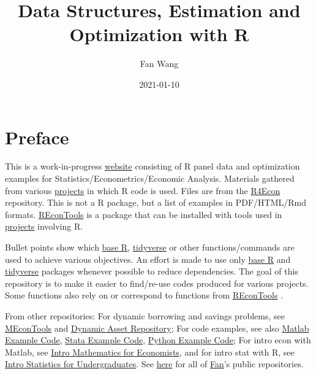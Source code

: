 \documentclass[
]{book}
\title{Data Structures, Estimation and Optimization with R}
\author{Fan Wang}
\date{2021-01-10}
\begin{document}
\maketitle

{
\hypersetup{linkcolor=}
\setcounter{tocdepth}{1}
\tableofcontents
}
\hypertarget{preface}{%
\chapter*{Preface}\label{preface}}

This is a work-in-progress \href{https://fanwangecon.github.io/R4Econ/}{website} consisting of R panel data and optimization examples for Statistics/Econometrics/Economic Analysis. Materials gathered from various \href{https://fanwangecon.github.io/research}{projects} in which R code is used. Files are from the \href{https://github.com/FanWangEcon/R4Econ}{R4Econ} repository. This is not a R package, but a list of examples in PDF/HTML/Rmd formats. \href{https://fanwangecon.github.io/REconTools/}{REconTools} is a package that can be installed with tools used in \href{https://fanwangecon.github.io/research}{projects} involving R.

Bullet points show which \href{https://www.rdocumentation.org/packages/base/versions/3.5.2}{base R}, \href{https://www.tidyverse.org/}{tidyverse} or other functions/commands are used to achieve various objectives. An effort is made to use only \href{https://www.rdocumentation.org/packages/base/versions/3.5.2}{base R} \citep{R-base} and \href{https://www.tidyverse.org/}{tidyverse} \citep{R-tidyverse} packages whenever possible to reduce dependencies. The goal of this repository is to make it easier to find/re-use codes produced for various projects. Some functions also rely on or correspond to functions from \href{https://fanwangecon.github.io/REconTools/}{REconTools} \citep{R-REconTools}.

From other repositories: For dynamic borrowing and savings problems, see \href{https://fanwangecon.github.io/MEconTools/}{MEconTools} and \href{https://fanwangecon.github.io/CodeDynaAsset/}{Dynamic Asset Repository}; For code examples, see also \href{https://fanwangecon.github.io/M4Econ/}{Matlab Example Code}, \href{https://fanwangecon.github.io/Stata4Econ/}{Stata Example Code}, \href{https://fanwangecon.github.io/pyfan/}{Python Example Code}; For intro econ with Matlab, see \href{https://fanwangecon.github.io/Math4Econ/}{Intro Mathematics for Economists}, and for intro stat with R, see \href{https://fanwangecon.github.io/Stat4Econ/}{Intro Statistics for Undergraduates}. See \href{https://github.com/FanWangEcon}{here} for all of \href{https://fanwangecon.github.io/}{Fan}'s public repositories.
\end{document}

